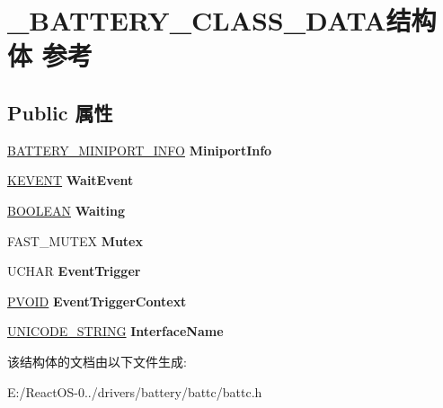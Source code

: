 \hypertarget{struct___b_a_t_t_e_r_y___c_l_a_s_s___d_a_t_a}{}\section{\+\_\+\+B\+A\+T\+T\+E\+R\+Y\+\_\+\+C\+L\+A\+S\+S\+\_\+\+D\+A\+T\+A结构体 参考}
\label{struct___b_a_t_t_e_r_y___c_l_a_s_s___d_a_t_a}
\subsection*{Public 属性}
\begin{DoxyCompactItemize}
\item 
\mbox{\label{struct___b_a_t_t_e_r_y___c_l_a_s_s___d_a_t_a_ad84c4df74a413a9f1e6371d43317b198}} 
\hyperlink{struct___b_a_t_t_e_r_y___m_i_n_i_p_o_r_t___i_n_f_o}{B\+A\+T\+T\+E\+R\+Y\+\_\+\+M\+I\+N\+I\+P\+O\+R\+T\+\_\+\+I\+N\+FO} {\bfseries Miniport\+Info}
\item 
\mbox{\label{struct___b_a_t_t_e_r_y___c_l_a_s_s___d_a_t_a_a1c433c57d3f38cf0fdc3fd2026a49927}} 
\hyperlink{struct___k_e_v_e_n_t}{K\+E\+V\+E\+NT} {\bfseries Wait\+Event}
\item 
\mbox{\label{struct___b_a_t_t_e_r_y___c_l_a_s_s___d_a_t_a_adf0619cc33b99eb7434406acc8e730ad}} 
\hyperlink{_processor_bind_8h_a112e3146cb38b6ee95e64d85842e380a}{B\+O\+O\+L\+E\+AN} {\bfseries Waiting}
\item 
\mbox{\label{struct___b_a_t_t_e_r_y___c_l_a_s_s___d_a_t_a_aaecfc22386ad1a4c1d47b87426c9005c}} 
F\+A\+S\+T\+\_\+\+M\+U\+T\+EX {\bfseries Mutex}
\item 
\mbox{\label{struct___b_a_t_t_e_r_y___c_l_a_s_s___d_a_t_a_a504216bb8502092dc583d312d166dcca}} 
U\+C\+H\+AR {\bfseries Event\+Trigger}
\item 
\mbox{\label{struct___b_a_t_t_e_r_y___c_l_a_s_s___d_a_t_a_a614b18d6f6e8cc8ac046a514218530b2}} 
\hyperlink{interfacevoid}{P\+V\+O\+ID} {\bfseries Event\+Trigger\+Context}
\item 
\mbox{\label{struct___b_a_t_t_e_r_y___c_l_a_s_s___d_a_t_a_a0011938d7aad2b81aa27fee0141d0193}} 
\hyperlink{struct___u_n_i_c_o_d_e___s_t_r_i_n_g}{U\+N\+I\+C\+O\+D\+E\+\_\+\+S\+T\+R\+I\+NG} {\bfseries Interface\+Name}
\end{DoxyCompactItemize}


该结构体的文档由以下文件生成\+:\begin{DoxyCompactItemize}
\item 
E\+:/\+React\+O\+S-\/0../drivers/battery/battc/battc.\+h\end{DoxyCompactItemize}
